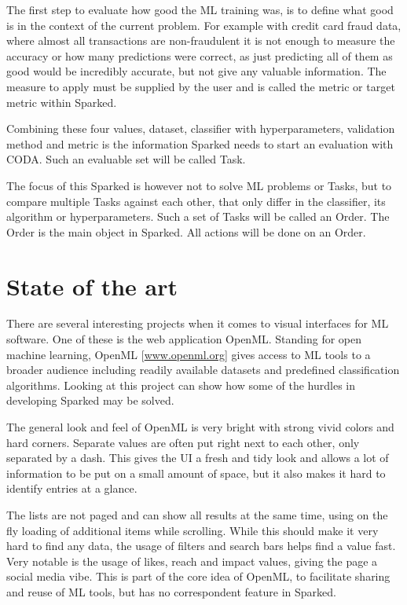 The first step to evaluate how good the ML training was, is to define what good is in the context of the current problem. For example with credit card fraud data, where almost all transactions are non-fraudulent it is not enough to measure the accuracy or how many predictions were correct, as just predicting all of them as good would be incredibly accurate, but not give any valuable information. The measure to apply must be supplied by the user and is called the metric or target metric within Sparked. 

Combining these four values, dataset, classifier with hyperparameters, validation method and metric is the information Sparked needs to start an evaluation with CODA. Such an evaluable set will be called Task. 

The focus of this Sparked is however not to solve ML problems or Tasks, but to compare multiple Tasks against each other, that only differ in the classifier, 
its algorithm or hyperparameters. Such a set of Tasks will be called an Order. The Order is the main object in Sparked. All actions will be done on an Order. 













\section{State of the art}
There are several interesting projects when it comes to visual interfaces for ML software. One of these is the web application OpenML. Standing for open machine learning, OpenML [\hyperlink{www.openml.org}{www.openml.org}] gives access to ML tools to a broader audience including readily available datasets and predefined classification algorithms. Looking at this project can show how some of the hurdles in developing Sparked may be solved.

The general look and feel of OpenML is very bright with strong vivid colors and hard corners. Separate values are often put right next to each other, only separated by a dash. This gives the UI a fresh and tidy look and allows a lot of information to be put on a small amount of space, but it also makes it hard to identify entries at a glance. 

The lists are not paged and can show all results at the same time, using on the fly loading of additional items while scrolling. While this should make it very hard to find any data, the usage of filters and search bars helps find a value fast. 
Very notable is the usage of likes, reach and impact values, giving the page a social media vibe. This is part of the core idea of OpenML, to facilitate sharing and reuse of ML tools, but has no correspondent feature in Sparked. 



